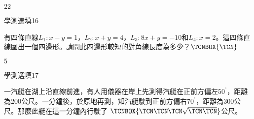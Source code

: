 \begin{QUESTIONS}
\begin{QUESTION}
\begin{QBODY}
        \end{QBODY}
        \begin{QFROMS}
        \end{QFROMS}
        \begin{QTAGS}\end{QTAGS}
        \begin{QANS}
            $22$
        \end{QANS}
        \begin{QSOLLIST}
        \end{QSOLLIST}
        \begin{QEMPTYSPACE}
        \end{QEMPTYSPACE}
    \end{QUESTION}
    \begin{QUESTION}
        \begin{ExamInfo}{84}{學測}{選填}{16}
        \end{ExamInfo}
        \begin{ExamAnsRateInfo}{}{}{}{}
        \end{ExamAnsRateInfo}
        \begin{QBODY}
            有四條直線${{L}_{1}}:x-y=1$，${{L}_{2}}:x+y=4$，${{L}_{3}}:8x+y=-10$和${{L}_{4}}:x=2$。這四條直線圍出一個四邊形。請問此四邊形較短的對角線長度為多少？$\TCNBOX{\TCN}$
        \end{QBODY}
        \begin{QFROMS}
        \end{QFROMS}
        \begin{QTAGS}\end{QTAGS}
        \begin{QANS}
            $5$
        \end{QANS}
        \begin{QSOLLIST}
        \end{QSOLLIST}
        \begin{QEMPTYSPACE}
        \end{QEMPTYSPACE}
    \end{QUESTION}
    \begin{QUESTION}
        \begin{ExamInfo}{84}{學測}{選填}{17}
        \end{ExamInfo}
        \begin{ExamAnsRateInfo}{}{}{}{}
        \end{ExamAnsRateInfo}
        \begin{QBODY}
            一汽艇在湖上沿直線前進，有人用儀器在岸上先測得汽艇在正前方偏左${{50}^{{}^\circ }}$，距離為200公尺。一分鐘後，於原地再測，知汽艇駛到正前方偏右${{70}^{{}^\circ }}$，距離為300公尺。那麼此艇在這一分鐘內行駛了 $\TCNBOX{\TCN\TCN\TCN\sqrt{\TCN\TCN}}$公尺。

\end{QBODY}
\end{QUESTION}
\end{QUESTIONS}
